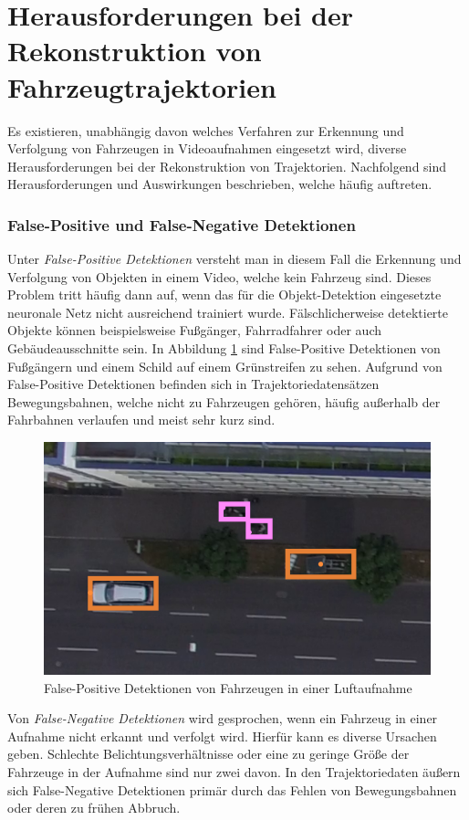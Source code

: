 \section{Herausforderungen bei der Rekonstruktion von Fahrzeugtrajektorien}
\label{sec:grund_challenges_reconstruction}

Es existieren, unabhängig davon welches Verfahren zur Erkennung und Verfolgung von Fahrzeugen in Videoaufnahmen
eingesetzt wird, diverse Herausforderungen bei der Rekonstruktion von Trajektorien. Nachfolgend sind
Herausforderungen und Auswirkungen beschrieben, welche häufig auftreten.

\subsubsection*{False-Positive und False-Negative Detektionen}
Unter \textit{False-Positive Detektionen} versteht man in diesem Fall die Erkennung und Verfolgung
von Objekten in einem Video, welche kein Fahrzeug sind.
Dieses Problem tritt häufig dann auf, wenn das für die Objekt-Detektion eingesetzte neuronale Netz nicht ausreichend trainiert wurde.
Fälschlicherweise detektierte Objekte können beispielsweise Fußgänger, Fahrradfahrer oder auch Gebäudeausschnitte sein.
In Abbildung \ref{fig:grund_false_positive_detections} sind False-Positive Detektionen von Fußgängern
und einem Schild auf einem Grünstreifen zu sehen.
Aufgrund von False-Positive Detektionen befinden sich in Trajektoriedatensätzen Bewegungsbahnen, welche nicht zu
Fahrzeugen gehören, häufig außerhalb der Fahrbahnen verlaufen und meist sehr kurz sind.

\begin{figure}[H]
    \centering
    \includegraphics[width=0.45\linewidth]{resources/img/grundlagen/TrajectoryReconstruction/challenges/False-Positives}
    \caption[False-Positive Detektionen]{False-Positive Detektionen von Fahrzeugen in einer Luftaufnahme}
    \label{fig:grund_false_positive_detections}
\end{figure}

Von \textit{False-Negative Detektionen} wird gesprochen, wenn ein Fahrzeug in einer Aufnahme nicht
erkannt und verfolgt wird. Hierfür kann es diverse Ursachen geben. Schlechte Belichtungsverhältnisse
oder eine zu geringe Größe der Fahrzeuge in der Aufnahme sind nur zwei davon.
In den Trajektoriedaten äußern sich False-Negative Detektionen primär durch das Fehlen von Bewegungsbahnen
oder deren zu frühen Abbruch.

